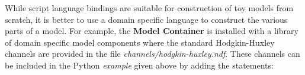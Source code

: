 \documentclass[10pt]{article}
\begin{document}

While script language bindings are suitable for construction of toy
models from scratch, it is better to use a domain specific language to
construct the various parts of a model. For example, the {\bf
  Model Container} is installed with a library of domain specific
model components where the standard Hodgkin-Huxley channels are
provided in the file {\it channels/hodgkin-huxley.ndf}.  These
channels can be included in the Python {\it example} given above by adding
the statements:
\end{document}
